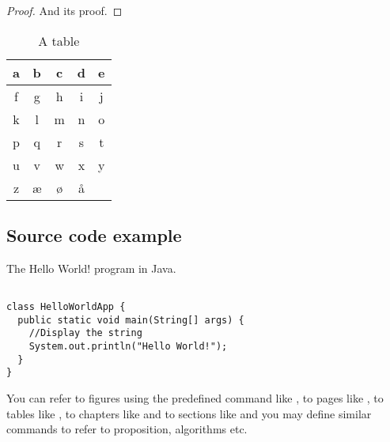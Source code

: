 \begin{proof}
\vspace*{-1em} %
And its proof.
\end{proof}

\begin{table}
\caption{\label{tab:example}A table}
\centering
\begin{tabular}[b]{| c | c | c | c | c |}
\hline
a & b & c & d & e \\ \hline
f & g & h & i & j \\ \hline
k & l & m & n & o \\ \hline
p & q & r & s & t \\ \hline
u & v & w & x & y \\ \hline
z & æ & ø & å &   \\ \hline
\end{tabular} 
\end{table}

\subsection{Source code example}

\begin{algorithm}[h]
  \caption{The Hello World! program in Java.}
  \label{hello_world}
  \begin{verbatim}
  
class HelloWorldApp {
  public static void main(String[] args) {
    //Display the string
    System.out.println("Hello World!");
  }
}
\end{verbatim}
\end{algorithm}

You can refer to figures using the predefined command like , to pages like , to tables like , to chapters like  and to sections like  and you may define similar commands to refer to proposition, algorithms etc.
